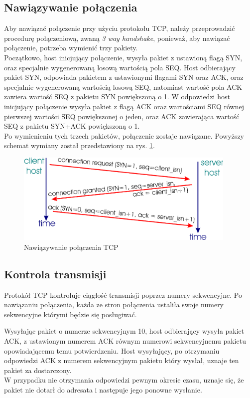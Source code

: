 		\subsection{Nawiązywanie połączenia}
			Aby nawiązać połączenie przy użyciu protokołu TCP, należy przeprowadzić procedurę połączeniową, zwaną \textit{3 way handshake}, ponieważ, aby nawiązać połączenie, potrzeba wymienić trzy pakiety.\\
			Początkowo, host inicjujący połączenie, wysyła pakiet z ustawioną flagą SYN, oraz specjalnie wygenerowaną losową wartością pola SEQ. Host odbierający pakiet SYN, odpowiada pakietem z ustawionymi flagami SYN oraz ACK, oraz specjalnie wygenerowaną wartością losową SEQ, natomiast wartość pola ACK zawiera wartość SEQ z pakietu SYN powiększoną o 1.
			W odpowiedzi host inicjujący połączenie wysyła pakiet z flagą ACK oraz wartościami SEQ równej pierwszej wartości SEQ powiększonej o jeden, oraz ACK zawierająca wartość SEQ z pakietu SYN+ACK powiększoną o 1.\\
			Po wymienieniu tych trzech pakietów, połączenie zostaje nawiązane.
			Powyższy schemat wymiany został przedstawiony na rys. \ref{fig:tcp_syn}.
			\begin{figure}[h]
				\centering
					\includegraphics[width=400px]{tcp_3way.png}
					\caption{Nawiązywanie połączenia TCP}
					\label{fig:tcp_syn}
			\end{figure}
		\subsection{Kontrola transmisji}
			Protokół TCP kontroluje ciągłość transmisji poprzez numery sekwencyjne.
			Po nawiązaniu połączenia, każda ze stron połączenia ustaliła swoje numery sekwencyjne którymi będzie się posługiwać.
			
			Wysyłając pakiet o numerze sekwencyjnym 10, host odbierający wysyła pakiet ACK, z ustawionym numerem ACK równym numerowi sekwencyjnemu pakietu opowiadającemu temu potwierdzeniu.
			Host wysyłający, po otrzymaniu odpowiedzi ACK z numerem sekwencyjnym pakietu który wysłał, uznaje ten pakiet za dostarczony.\\
			W przypadku nie otrzymania odpowiedzi pewnym okresie czasu, uznaje się, że pakiet nie dotarł do adresata i następuje jego ponowne wysłanie.


